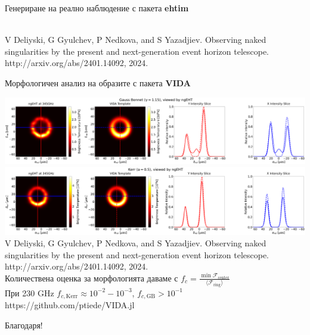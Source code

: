 \documentclass[hyperref={colorlinks,citecolor=blue,linkcolor=blue,urlcolor=blue}]{beamer}
\begin{document}
\begin{frame}{Генериране на реално наблюдение с пакета \textbf{ehtim}}
\begin{minipage}{13em}
		\end{minipage}\\
		
		\tiny V Deliyski, G Gyulchev, P Nedkova, and S Yazadjiev.
		Observing naked singularities by the present and next-generation event horizon
		telescope. http://arxiv.org/abs/2401.14092, 2024.
	\end{frame}
	
	\begin{frame}{Морфологичен анализ на образите с пакета \textbf{VIDA}}

		\includegraphics[scale = 0.11]{Pre-Defence/Ehtim_Vida_plot_ngEHT_345.png}\\
		
		\includegraphics[scale = 0.11]{Pre-Defence/Ehtim_Vida_plot_ngEHT_345_kerr.png}\newline
		\tiny V Deliyski, G Gyulchev, P Nedkova, and S Yazadjiev.
		Observing naked singularities by the present and next-generation event horizon
		telescope. http://arxiv.org/abs/2401.14092, 2024.\\
		
		\small
		Количествена оценка за морфологията даваме с $f_c = \frac{\min\mathcal{F}_{\text{center}}}{\langle{\mathcal{F}}_{\text{ring}}\rangle}$\\
		При 230 GHz $f_{c,\text{Kerr}} \approx 10^{-2} - 10^{-3}$, $f_{c,\text{GB}} > 10^{-1} $\\
		
		\centering \small https://github.com/ptiede/VIDA.jl
	\end{frame}
	
	\begin{frame}
		\centering
		Благодаря!
	\end{frame}
	
\end{document}
